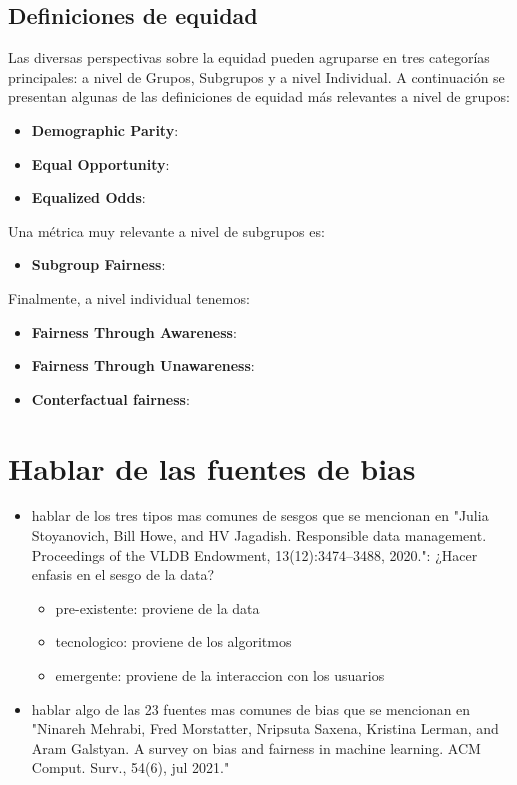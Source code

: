 \subsection{Definiciones de equidad}
Las diversas perspectivas sobre la equidad pueden agruparse en tres categor\'ias principales: a nivel de Grupos, Subgrupos y a nivel Individual. 
A continuaci\'on se presentan algunas de las definiciones de equidad m\'as relevantes a nivel de grupos:

\begin{itemize}
    \item \textbf{Demographic Parity}: \cite{fairness_def}
    \item \textbf{Equal Opportunity}: \cite{fairness_def}
    \item \textbf{Equalized Odds}: \cite{fairness_def}
\end{itemize}

Una m\'etrica muy relevante a nivel de subgrupos es:

\begin{itemize}
    \item \textbf{Subgroup Fairness}: \cite{subgroup_fairness}
\end{itemize}

Finalmente, a nivel individual tenemos:

\begin{itemize}
    \item \textbf{Fairness Through Awareness}: \cite{fair_awareness}
    \item \textbf{Fairness Through Unawareness}: \cite{counterfactual}
    \item \textbf{Conterfactual fairness}: \cite{counterfactual}
\end{itemize}

\section{Hablar de las fuentes de bias}
\begin{itemize}
    \item hablar de los tres tipos mas comunes de sesgos que se mencionan en "Julia Stoyanovich, Bill Howe, and HV Jagadish. Responsible data management. Proceedings of the VLDB
    Endowment, 13(12):3474–3488, 2020.": ¿Hacer enfasis en el sesgo de la data?
    \begin{itemize}
        \item pre-existente: proviene de la data
        \item tecnologico: proviene de los algoritmos
        \item emergente: proviene de la interaccion con los usuarios
    \end{itemize}
    \item hablar algo de las 23 fuentes mas comunes de bias 
    que se mencionan en "Ninareh Mehrabi, Fred Morstatter, Nripsuta Saxena, Kristina Lerman, and Aram Galstyan. A survey on bias and
    fairness in machine learning. ACM Comput. Surv., 54(6), jul 2021."
\end{itemize}

